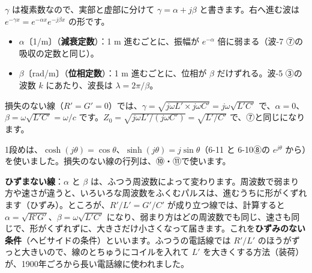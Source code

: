 $\gamma$ は複素数なので、実部と虚部に分けて $\gamma=\alpha+j\beta$ と書きます。右へ進む波は $e^{-\gamma x}=e^{-\alpha x}e^{-j\beta x}$ の形です。
\begin{itemize}[leftmargin=1.2\zw, itemsep=1pt, topsep=1pt, label={\color{bkTheme}●}]
\item $\alpha$〔1/m〕（\textbf{減衰定数}）：1 m 進むごとに、振幅が $e^{-\alpha}$ 倍に弱まる（波-7 ⑦の吸収の定数と同じ）。
\item $\beta$〔rad/m〕（\textbf{位相定数}）：1 m 進むごとに、位相が $\beta$ だけずれる。波-5 ③の波数 $k$ にあたり、波長は $\lambda=2\pi/\beta$。
\end{itemize}
損失のない線（$R'=G'=0$）では、$\gamma=\sqrt{j\omega L'\times j\omega C'}=j\omega\sqrt{L'C'}$ で、$\alpha=0$、$\beta=\omega\sqrt{L'C'}=\omega/c$ です。$Z_0=\sqrt{j\omega L'/(j\omega C')}=\sqrt{L'/C'}$ で、⑦と同じになります。

\begin{phflow}[長さ $l$ の線の行列]
\end{phflow}
1段めは、$\cosh(j\theta)=\cos\theta$、$\sinh(j\theta)=j\sin\theta$（6-11 と 6-10⑧の $e^{j\theta}$ から）を使いました。損失のない線の行列は、⑩・⑪で使います。

\begin{motto}[5]
\textbf{ひずまない線}：$\alpha$ と $\beta$ は、ふつう周波数によって変わります。周波数で弱まり方や速さが違うと、いろいろな周波数をふくむパルスは、進むうちに形がくずれます（ひずみ）。ところが、$R'/L'=G'/C'$ が成り立つ線では、計算すると $\alpha=\sqrt{R'G'}$、$\beta=\omega\sqrt{L'C'}$ になり、弱まり方はどの周波数でも同じ、速さも同じで、形がくずれずに、大きさだけ小さくなって届きます。これを\textbf{ひずみのない条件}（ヘビサイドの条件）といいます。ふつうの電話線では $R'/L'$ のほうがずっと大きいので、線のとちゅうにコイルを入れて $L'$ を大きくする方法（装荷）が、1900年ごろから長い電話線に使われました。
\end{motto}

